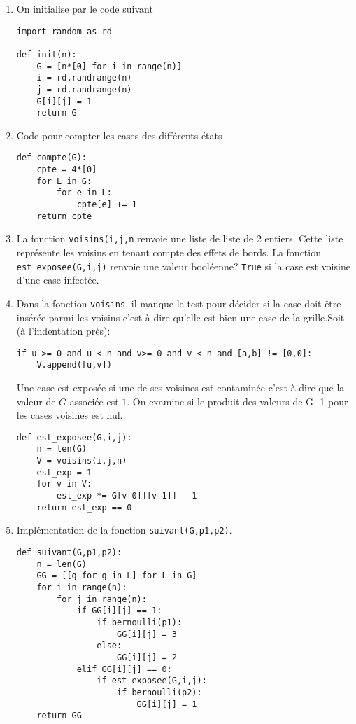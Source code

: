 \begin{enumerate}
 \item On initialise par le code suivant
\begin{lstlisting}
import random as rd

def init(n):
    G = [n*[0] for i in range(n)]
    i = rd.randrange(n)
    j = rd.randrange(n)
    G[i][j] = 1
    return G 
\end{lstlisting}

 \item Code pour compter les cases des différents états
 \begin{lstlisting}
def compte(G):
    cpte = 4*[0]
    for L in G:
        for e in L:
            cpte[e] += 1
    return cpte
 \end{lstlisting}

 \item La fonction \texttt{voisins(i,j,n} renvoie une liste de liste de 2 entiers. Cette liste représente les voisins en tenant compte des effets de bords.\newline
 La fonction \texttt{est\_exposee(G,i,j)} renvoie une valeur booléenne? \texttt{True} si la case est voisine d'une case infectée.
 
 \item Dans la fonction \texttt{voisins}, il manque le test pour décider si la case doit être insérée parmi les voisins c'est à dire qu'elle est bien une case de la grille.\newline Soit (à l'indentation près):
\begin{lstlisting}
if u >= 0 and u < n and v>= 0 and v < n and [a,b] != [0,0]:
    V.append([u,v])
\end{lstlisting}
Une case est exposée si une de ses voisines est contaminée c'est à dire que la valeur de $G$ associée est $1$. On examine si le produit des valeurs de G -1 pour les cases voisines est nul.
\begin{lstlisting}
def est_exposee(G,i,j):
    n = len(G)
    V = voisins(i,j,n)
    est_exp = 1
    for v in V:
        est_exp *= G[v[0]][v[1]] - 1
    return est_exp == 0
\end{lstlisting}

 \item Implémentation de la fonction \texttt{suivant(G,p1,p2)}.
\begin{lstlisting}
def suivant(G,p1,p2):
    n = len(G)
    GG = [[g for g in L] for L in G]
    for i in range(n):
        for j in range(n):
            if GG[i][j] == 1:
                if bernoulli(p1):
                    GG[i][j] = 3
                else:
                    GG[i][j] = 2
            elif GG[i][j] == 0:
                if est_exposee(G,i,j):
                    if bernoulli(p2):
                        GG[i][j] = 1
    return GG
\end{lstlisting}


\end{enumerate}
